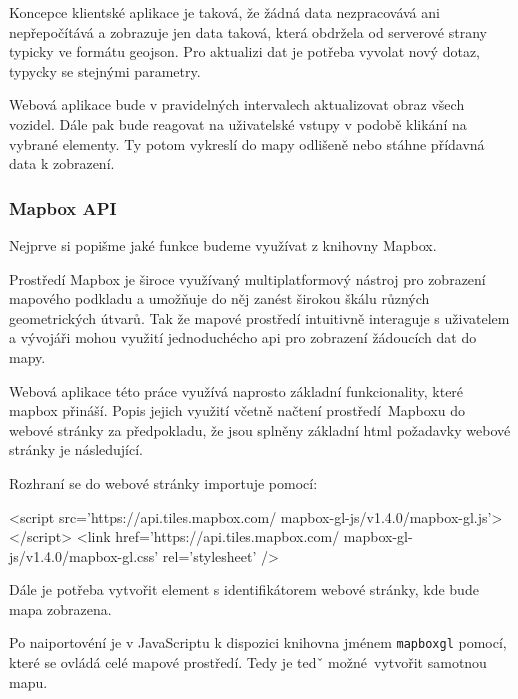 \bigbreak

Koncepce klientské aplikace je taková, že žádná data nezpracovává ani nepřepočítává a zobrazuje jen data taková, která obdržela od serverové strany typicky ve formátu \gls{geojson}. Pro aktualizi dat je potřeba vyvolat nový dotaz, typycky se stejnými parametry.

\bigbreak

Webová aplikace bude v pravidelných intervalech aktualizovat obraz všech vozidel. Dále pak bude reagovat na uživatelské vstupy v podobě klikání na vybrané elementy. Ty potom vykreslí do mapy odlišeně nebo stáhne přídavná data k zobrazení.

\subsubsection{Mapbox API}

Nejprve si popišme jaké funkce budeme využívat z knihovny Mapbox.

\bigbreak

Prostředí Mapbox je široce využívaný multiplatformový nástroj pro zobrazení mapového podkladu a umožňuje do něj zanést širokou škálu různých geometrických útvarů. Tak že mapové prostředí intuitivně interaguje s uživatelem a vývojáři mohou využití jednoduchécho \gls{api} pro zobrazení žádoucích dat do mapy.

\bigbreak

Webová aplikace této práce využívá naprosto základní funkcionality, které mapbox přináší.  Popis jejich využití včetně načtení prostředí Mapboxu do webové stránky za předpokladu, že jsou splněny základní \gls{html} požadavky webové stránky je následující.

\bigbreak

Rozhraní se do webové stránky importuje pomocí:

\begin{code}[frame=none]
<script src='https://api.tiles.mapbox.com/
  mapbox-gl-js/v1.4.0/mapbox-gl.js'></script>
<link href='https://api.tiles.mapbox.com/
  mapbox-gl-js/v1.4.0/mapbox-gl.css' rel='stylesheet' />
\end{code}

\bigbreak

Dále je potřeba vytvořit element s identifikátorem webové stránky, kde bude mapa zobrazena.

\bigbreak

Po naiportovéní je v JavaScriptu k dispozici knihovna jménem \verb-mapboxgl- pomocí, které se ovládá celé mapové prostředí. Tedy je tedˇ možné vytvořit samotnou mapu.

